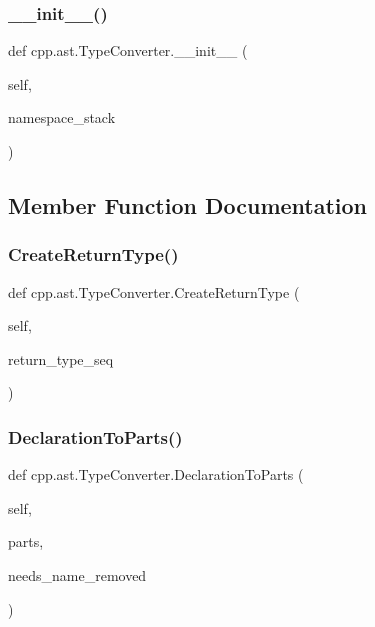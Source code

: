 \subsubsection{\texorpdfstring{\+\_\+\+\_\+init\+\_\+\+\_\+()}{\_\_init\_\_()}}
{\footnotesize\ttfamily def cpp.\+ast.\+Type\+Converter.\+\_\+\+\_\+init\+\_\+\+\_\+ (\begin{DoxyParamCaption}\item[{}]{self,  }\item[{}]{namespace\+\_\+stack }\end{DoxyParamCaption})}



\subsection{Member Function Documentation}
\mbox{\label{classcpp_1_1ast_1_1_type_converter_a7e4d429131d9d5742ec44c78b61beb87}} 
\subsubsection{\texorpdfstring{Create\+Return\+Type()}{CreateReturnType()}}
{\footnotesize\ttfamily def cpp.\+ast.\+Type\+Converter.\+Create\+Return\+Type (\begin{DoxyParamCaption}\item[{}]{self,  }\item[{}]{return\+\_\+type\+\_\+seq }\end{DoxyParamCaption})}

\mbox{\label{classcpp_1_1ast_1_1_type_converter_a7c9d20d107c2bc0eb80afdf04957825f}} 
\subsubsection{\texorpdfstring{Declaration\+To\+Parts()}{DeclarationToParts()}}
{\footnotesize\ttfamily def cpp.\+ast.\+Type\+Converter.\+Declaration\+To\+Parts (\begin{DoxyParamCaption}\item[{}]{self,  }\item[{}]{parts,  }\item[{}]{needs\+\_\+name\+\_\+removed }\end{DoxyParamCaption})}

